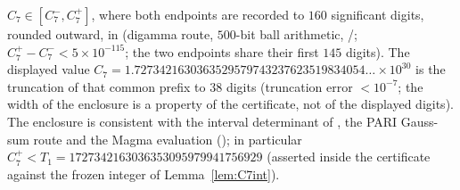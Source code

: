 $C_7\in[C_7^-,C_7^+]$, where both endpoints are recorded to $160$ significant digits, rounded outward, in  (digamma route, $500$-bit ball arithmetic, /; $C_7^+-C_7^-<5\times10^{-115}$; the two endpoints share their first $145$ digits). The displayed value $C_7=1.7273421630363529579743237623519834054\ldots\times10^{30}$ is the truncation of that common prefix to $38$ digits (truncation error $<10^{-7}$; the width of the enclosure is a property of the certificate, not of the displayed digits). The enclosure is consistent with the interval determinant of , the PARI Gauss-sum route and the Magma evaluation (); in particular $C_7^+<T_1=1727342163036353095979941756929$ (asserted inside the certificate against the frozen integer of Lemma~\ref{lem:C7int}).
